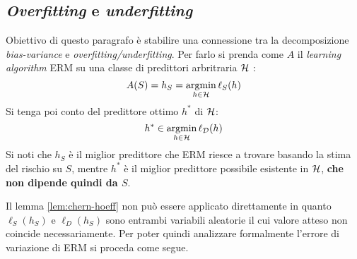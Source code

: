 \subsection{\textit{Overfitting} e \textit{underfitting}}
Obiettivo di questo paragrafo è stabilire una connessione tra la decomposizione
\textit{bias-variance} e \textit{overfitting/underfitting}. Per farlo si prenda come
$A$ il \textit{learning algorithm} ERM su una classe di predittori arbritraria 
$\mathcal{H}$  :
$$ A(S) = h_S = \operatorname*{argmin}_{h \in \mathcal{H}}\ell_S(h) $$
Si tenga poi conto del predittore ottimo $h^*$ di $\mathcal{H}$:
$$ h^* \in \operatorname*{argmin}_{h\in\mathcal{H}} \ell_{\mathcal{D}}(h) $$
Si noti che $h_S$ è il miglior predittore che ERM riesce a trovare basando la stima
del rischio su $S$, mentre $h^*$ è il miglior predittore possibile esistente in
$\mathcal{H}$, \textbf{che non dipende quindi da $S$}.

Il lemma \ref{lem:chern-hoeff} non può essere applicato direttamente in quanto 
$\ell_S(h_S)$ e $\ell_D(h_S)$ sono entrambi variabili aleatorie il cui valore atteso
non coincide necessariamente. Per poter quindi analizzare formalmente l'errore
di variazione di ERM si proceda come segue.

